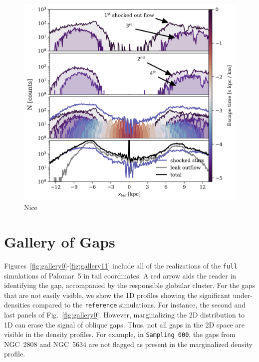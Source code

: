\documentclass{aa}
\begin{document}
\begin{appendix}
\begin{figure}
    \includegraphics[width=\linewidth]{decoherence_shocked_outflow.png}
    \caption{Nice}
    \label{fig:decoherence_shocked_outflow}
\end{figure}



  \section{Gallery of Gaps} \label{sec:gallery_of_gaps}
    Figures~\ref{fig:gallery0}-\ref{fig:gallery11} include all of the realizations of the \texttt{full} simulations of Palomar~5 in tail coordinates. A red arrow aids the reader in identifying the gap, accompanied by the responsible globular cluster. For the gaps that are not easily visible, we show the 1D profiles showing the significant under-densities compared to the \texttt{reference} simulations. For instance, the second and last panels of Fig.~\ref{fig:gallery0}. However, marginalizing the 2D distribution to 1D can erase the signal of oblique gaps. Thus, not all gaps in the 2D space are visible in the density profiles. For example, in \texttt{Sampling 000}, the gaps from NGC~2808 and NGC~5634 are not flagged as present in the marginalized density profile.


\end{appendix}
\end{document}
